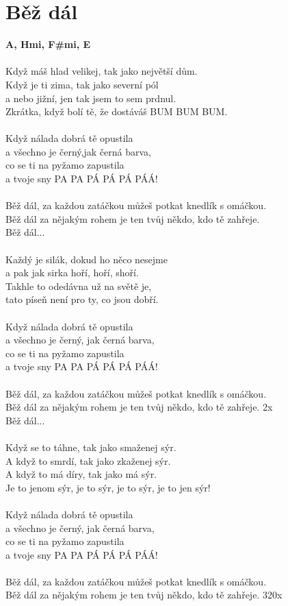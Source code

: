 \section{Běž dál}
\footnotesize\textbf{A, Hmi, F#mi, E\7}\\
\normalsize
\\
Když máš hlad velikej, tak jako největší dům.\\
Když je ti zima, tak jako severní pól\\
a nebo jižní, jen tak jsem to sem prdnul.\\
Zkrátka, když bolí tě, že dostáváš BUM BUM BUM.\\
\\
Když nálada dobrá tě opustila\\
a všechno je černý,jak černá barva,\\
co se ti na pyžamo zapustila\\
a tvoje sny PA PA PÁ PÁ PÁ PÁÁ!\\
\\
Běž dál, za každou zatáčkou můžeš potkat knedlík s omáčkou.\\
Běž dál za nějakým rohem je ten tvůj někdo, kdo tě zahřeje.\\
Běž dál...\\
\\
Každý je silák, dokud ho něco nesejme\\
a pak jak sirka hoří, hoří, shoří.\\
Takhle to odedávna už na světě je,\\
tato píseň není pro ty, co jsou dobří.\\
\\
Když nálada dobrá tě opustila\\
a všechno je černý, jak černá barva,\\
co se ti na pyžamo zapustila\\
a tvoje sny PA PA PÁ PÁ PÁ PÁÁ!\\
\\
Běž dál, za každou zatáčkou můžeš potkat knedlík s omáčkou.\\
Běž dál za nějakým rohem je ten tvůj někdo, kdo tě zahřeje. 2x\\
Běž dál...\\
\\
Když se to táhne, tak jako smaženej sýr.\\
A když to smrdí, tak jako zkaženej sýr.\\
A když to má díry, tak jako má sýr.\\
Je to jenom sýr, je to sýr, je to sýr, je to jen sýr!\\
\\
Když nálada dobrá tě opustila\\
a všechno je černý, jak černá barva,\\
co se ti na pyžamo zapustila\\
a tvoje sny PA PA PÁ PÁ PÁ PÁÁ!\\
\\
Běž dál, za každou zatáčkou můžeš potkat knedlík s omáčkou.\\
Běž dál za nějakým rohem je ten tvůj někdo, kdo tě zahřeje. 320x
